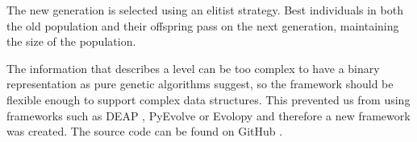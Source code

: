 \documentclass[runningheads,a4paper]{llncs}
\begin{document}
The new generation is selected using an elitist strategy. Best individuals in 
both the old population and their offspring pass on the next generation, 
maintaining the size of the population.








The information that describes a level can be too complex to have a binary 
representation as pure genetic algorithms suggest, so the framework should be 
flexible enough to support complex data structures. This prevented us from using 
frameworks such as DEAP \cite{fortin2012deap}, PyEvolve \cite{perone2009pyevolve} or Evolopy \cite{evolopy} and therefore a new framework was created. The source  code can be found on GitHub \cite{ab-level}.

\end{document}
